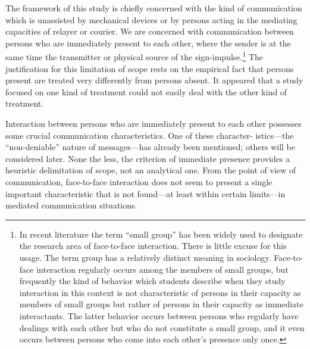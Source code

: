 \documentclass[twoside,symmetric,nobib,justified]{tufte-book}
\begin{document}
The framework of this study is chiefly concerned with the kind of
communication which is unassisted by mechanical devices or by persons
acting in the mediating capacities of relayer or courier. We are
concerned with communication between persons who are immediately present
to each other, where the sender is at the same time the transmitter or
physical source of the sign-impulse.\footnote{In recent literature the
  term ``small group'' has been widely used to designate the research
  area of face-to-face interaction. There is little excuse for this
  usage. The term group has a relatively distinct meaning in sociology.
  Face-to-face interaction regularly occurs among the members of small
  groups, but frequently the kind of behavior which students describe
  when they study interaction in this context is not characteristic of
  persons in their capacity as members of small groups but rather of
  persons in their capacity as immediate interactants. The latter
  behavior occurs between persons who regularly have dealings with each
  other but who do not constitute a small group, and it even occurs
  between persons who come into each other's presence only once.} The
justification for this limitation of scope rests on the empirical fact
that persons present are treated very differently from persons absent.
It appeared that a study focused on one kind of treatment could not
easily deal with the other kind of treatment.

Interaction between persons who are immediately present to each other
possesses some crucial communication characteristics. One of these
character- istics---the ``non-deniable'' nature of messages---has already
been mentioned; others will be considered later. None the less, the
criterion of immediate presence provides a heuristic delimitation of
scope, not an analytical one. From the point of view of communication,
face-to-face interaction does not seem to present a single important
characteristic that is not found---at least within certain limits---in
mediated communication situations.
\end{document}

